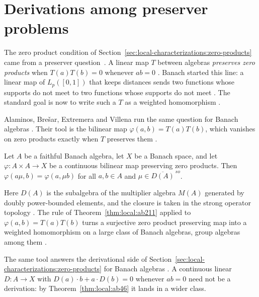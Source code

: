 \section{Derivations among preserver problems}\label{sec:local-characterizations:preservers}

The zero product condition of
Section~\ref{sec:local-characterizations:zero-products} came from a preserver
question~\cite[p.~132]{AlaminosBresar2009}. A linear map $T$ between algebras \emph{preserves zero products}
when $T(a)T(b)=0$ whenever $ab=0$ \cite[p.~131]{AlaminosBresar2009}. Banach
started this line: a linear map of $L_p([0,1])$ that keeps distances sends two
functions whose supports do not meet to two functions whose supports do not
meet \cite[p.~131]{AlaminosBresar2009}. The standard goal is now to write such
a $T$ as a weighted homomorphism \cite[p.~132]{AlaminosBresar2009}.

Alaminos, Bre\v{s}ar, Extremera and Villena run the same question for
Banach algebras \cite[p.~131]{AlaminosBresar2009}. Their tool is the
bilinear map $\varphi(a,b)=T(a)T(b)$, which vanishes on zero products
exactly when $T$ preserves them \cite[p.~132]{AlaminosBresar2009}.

\begin{theorem}\label{thm:local:ab211}
Let $A$ be a faithful Banach algebra, let $X$ be a Banach space, and let
$\varphi\colon A\times A\to X$ be a continuous bilinear map preserving zero
products. Then $\varphi(a\mu,b)=\varphi(a,\mu b)$ for all $a,b\in A$ and
$\mu\in\overline{D(A)}^{\,so}$.
\end{theorem}

Here $D(A)$ is the subalgebra of the multiplier algebra $M(A)$ generated by
doubly power-bounded elements, and the closure is taken in the strong
operator topology \cite[p.~143]{AlaminosBresar2009}. The rule of
Theorem~\ref{thm:local:ab211} applied to $\varphi(a,b)=T(a)T(b)$ turns a
surjective zero product preserving map into a weighted homomorphism on a
large class of Banach algebras, group algebras among them
\cite[Theorem~3.6, p.~147]{AlaminosBresar2009}.

The same tool answers the derivational side of
Section~\ref{sec:local-characterizations:zero-products} for Banach algebras
\cite[p.~155]{AlaminosBresar2009}. A continuous linear $D\colon A\to X$
with $D(a)\cdot b+a\cdot D(b)=0$ whenever $ab=0$ need not be a derivation:
by Theorem~\ref{thm:local:ab46} it lands in a wider class.

